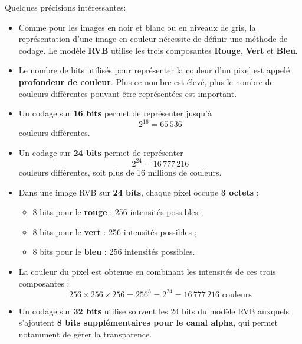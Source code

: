 \documentclass[11pt, a4paper]{book}
\begin{document}
Quelques précisions intéressantes:
\begin{itemize}[itemsep=3pt,leftmargin=+18mm]
\renewcommand{\labelitemi}{$\bullet$}

    \item Comme pour les images en noir et blanc ou en niveaux de gris, 
    la représentation d'une image en couleur nécessite de définir une 
    méthode de codage. Le modèle \textbf{RVB} utilise les trois composantes 
    \textbf{Rouge}, \textbf{Vert} et \textbf{Bleu}.

    \item Le nombre de bits utilisés pour représenter la couleur d'un pixel
    est appelé \textbf{profondeur de couleur}. Plus ce nombre est élevé,
    plus le nombre de couleurs différentes pouvant être représentées est important.

    \item Un codage sur \textbf{16 bits} permet de représenter jusqu'à
    \[
        2^{16} = 65\,536
    \]
    couleurs différentes.

    \item Un codage sur \textbf{24 bits} permet de représenter
    \[
        2^{24} = 16\,777\,216
    \]
    couleurs différentes, soit plus de 16 millions de couleurs.

    \item Dans une image RVB sur \textbf{24 bits}, chaque pixel occupe
    \textbf{3 octets} :
    \begin{itemize}
        \item 8 bits pour le \textbf{rouge} : 256 intensités possibles ;
        \item 8 bits pour le \textbf{vert} : 256 intensités possibles ;
        \item 8 bits pour le \textbf{bleu} : 256 intensités possibles.
    \end{itemize}

    \item La couleur du pixel est obtenue en combinant les intensités de ces
    trois composantes :
    \[
        256 \times 256 \times 256
        = 256^3 = 2^{24} 
        = 16\,777\,216 \text{ couleurs} 
    \]

    \item Un codage sur \textbf{32 bits} utilise souvent les 24 bits du modèle
    RVB auxquels s'ajoutent \textbf{8 bits supplémentaires pour le canal alpha},
    qui permet notamment de gérer la transparence.

\end{itemize}
\end{document}
